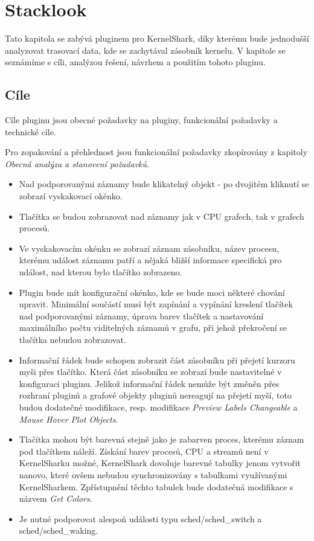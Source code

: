\chapter{Stacklook}
Tato kapitola se zabývá pluginem pro KernelShark, díky kterému bude jednodušší analyzovat trasovací data, kde se zachytával zásobník kernelu. V kapitole se seznámíme s cíli, analýzou řešení, návrhem a použitím tohoto pluginu.

\section{Cíle}

Cíle pluginu jsou obecné požadavky na pluginy, funkcionální požadavky a technické cíle.

Pro zopakování a přehlednost jsou funkcionální požadavky zkopírovány z kapitoly \emph{Obecná analýza a stanovení požadavků}.

\begin{itemize}
    \item Nad podporovanými záznamy bude klikatelný objekt - po dvojitém kliknutí se zobrazí vyskakovací okénko.
    \item Tlačítka se budou zobrazovat nad záznamy jak v CPU grafech, tak v grafech procesů.
    \item Ve vyskakovacím okénku se zobrazí záznam zásobníku, název procesu, kterému událost záznamu patří a nějaká bližší informace specifická pro událost, nad kterou bylo tlačítko zobrazeno.
    \item Plugin bude mít konfigurační okénko, kde se bude moci některé chování upravit. Minimální součástí musí být zapínání a vypínání kreslení tlačítek nad podporovanými záznamy, úprava barev tlačítek a nastavování maximálního počtu viditelných záznamů v grafu, při jehož překročení se tlačítka nebudou zobrazovat.
    \item Informační řádek bude schopen zobrazit část zásobníku při přejetí kurzoru myši přes tlačítko. Která část zásobníku se zobrazí bude nastavitelné v konfiguraci pluginu. Jelikož informační řádek nemůže být změněn přes rozhraní pluginů a grafové objekty pluginů nereagují na přejetí myší, toto budou dodatečné modifikace, resp. modifikace \emph{Preview Labels Changeable} a \emph{Mouse Hover Plot Objects}.
    \item Tlačítka mohou být barevná stejně jako je zabarven proces, kterému záznam pod tlačítkem náleží. Získání barev procesů, CPU a streamů není v KernelSharku možné, KernelShark dovoluje barevné tabulky jenom vytvořit nanovo, které ovšem nebudou synchronizovány s tabulkami využívanými KernelSharkem. Zpřístupnění těchto tabulek bude dodatečná modifikace s názvem \emph{Get Colors}.
    \item Je nutné podporovat alespoň události typu sched/sched\_switch a sched/sched\_waking.
\end{itemize}

